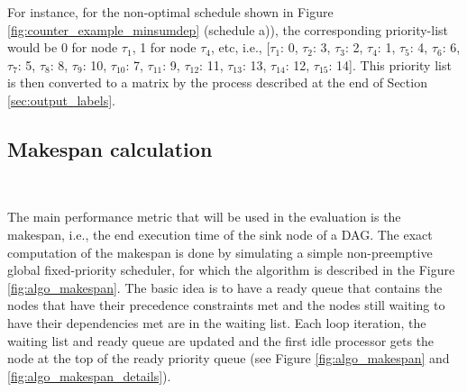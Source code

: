 For instance, for the non-optimal schedule shown in Figure \ref{fig:counter_example_minsumdep} (schedule a)),
the corresponding priority-list would be 0 for node $\tau_1$, 1 for node $\tau_4$,
etc, i.e., [$\tau_1$: 0, $\tau_2$: 3, $\tau_3$: 2, $\tau_4$: 1, $\tau_5$: 4, $\tau_6$: 6, $\tau_7$: 5, $\tau_8$: 8,
 $\tau_9$: 10, $\tau_10$: 7, $\tau_11$: 9, $\tau_12$: 11, $\tau_13$: 13, $\tau_14$: 12, $\tau_15$: 14].
This priority list is then converted to a matrix by the process described
at the end of Section \ref{sec:output_labels}.

\subsection{Makespan calculation}
~

The main performance metric that will be used in the evaluation
is the makespan, i.e., the end execution time of the sink node of a DAG.
The exact computation of the makespan is done by simulating a 
simple non-preemptive global fixed-priority scheduler, for which the algorithm
is described in the Figure \ref{fig:algo_makespan}.
The basic idea is to have a ready queue that contains the nodes
that have their precedence constraints met
and the nodes still waiting to have their dependencies met 
are in the waiting list. Each loop iteration, the waiting list and ready queue
are updated and the first idle processor gets the node at the top of 
the ready priority queue (see Figure \ref{fig:algo_makespan} and \ref{fig:algo_makespan_details}).

